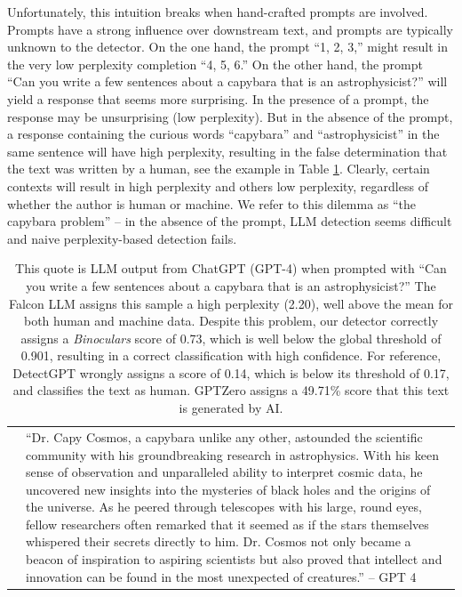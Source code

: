 \documentclass{article} %
\begin{document}
Unfortunately, this intuition breaks when hand-crafted prompts are involved. Prompts have a strong influence over downstream text, and prompts are typically unknown to the detector.  On the one hand, the prompt ``1, 2, 3,'' might result in the very low perplexity completion ``4, 5, 6.''  On the other hand, the prompt  ``Can you write a few sentences about a capybara that is an astrophysicist?'' will yield a response that seems more surprising. In the presence of a prompt, the response may be unsurprising (low perplexity). 
 But in the absence of the prompt, a response containing the curious words ``capybara'' and ``astrophysicist'' in the same sentence will have high perplexity, resulting in the false determination that the text was written by a human, see the example in Table \ref{tab:capybara}.  Clearly, certain contexts will result in high perplexity and others low perplexity, regardless of whether the author is human or machine. We refer to this dilemma as ``the capybara problem'' -- in the absence of the prompt, LLM detection seems difficult and naive perplexity-based detection fails. 

\begin{table}[ht!]
    \centering
     \begin{tcolorbox}[left=0mm,right=0mm,width=\textwidth,bottom=0mm,top=0mm,arc=0mm,auto outer arc]
    \begin{tabular}{m{0.1in}m{1.5in}m{1.5in}m{1.5in}}
         &\multicolumn{3}{p{5.9in}}{\looseness -1``Dr. Capy Cosmos, a capybara unlike any other, astounded the scientific community with his groundbreaking research in astrophysics. With his keen sense of observation and unparalleled ability to interpret cosmic data, he uncovered new insights into the mysteries of black holes and the origins of the universe. As he peered through telescopes with his large, round eyes, fellow researchers often remarked that it seemed as if the stars themselves whispered their secrets directly to him. Dr. Cosmos not only became a beacon of inspiration to aspiring scientists but also proved that intellect and innovation can be found in the most unexpected of creatures.'' -- GPT 4}\\
    \end{tabular}
    \caption{This quote is LLM output from ChatGPT (GPT-4) when prompted with ``Can you write a few sentences about a capybara that is an astrophysicist?'' The Falcon LLM assigns this sample a high perplexity (2.20), well above the mean for both human and machine data. Despite this problem, our detector correctly assigns a \emph{Binoculars} score of 0.73, which is well below the global threshold of 0.901, resulting in a correct classification with high confidence. For reference, DetectGPT wrongly assigns a score of 0.14, which is below its threshold of 0.17, and classifies the text as human. GPTZero assigns a 49.71\% score that this text is generated by AI. }
    \label{tab:capybara}
     \end{tcolorbox}
\end{table}
\end{document}
